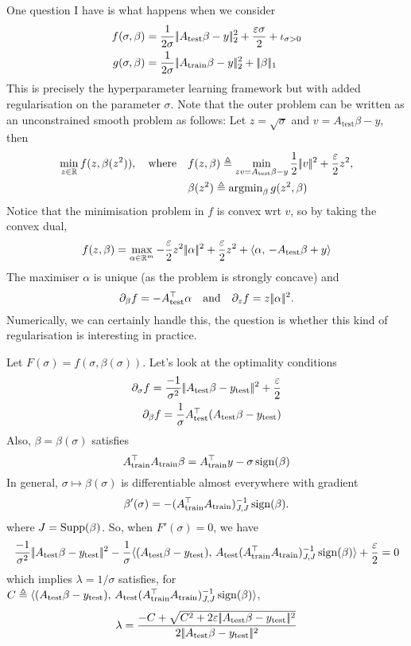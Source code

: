 \documentclass{article}
\begin{document}
One question I have is what happens when we consider
\begin{align*}
f(\sigma,\beta) &=  \frac{1}{2\sigma} |\!| A_{\mathrm{test}}\beta-y |\!|_2^2 +  \frac{\varepsilon\sigma}{2} +\iota_{\sigma>0}\\
g(\sigma,\beta) &= \frac{1}{2\sigma} |\!| A_{\mathrm{train}} \beta-y |\!|_2^2 +  |\!| \beta |\!|_1 
\end{align*}
This is precisely the hyperparameter learning framework but with added regularisation on the parameter $\sigma$. Note that the outer problem can be written as an unconstrained smooth problem as follows:
Let $z = \sqrt{\sigma}$ and $v =  A_{\mathrm{test}}\beta-y$, then
\begin{align*}
\min_{z\in\mathbb{R}}f(z, \beta(z^2)), \quad \text{where} \quad &f(z,\beta)\triangleq\min_{ zv =  A_{\mathrm{test}}\beta-y} \frac12  |\!| v |\!|^2 +\frac{\varepsilon}{2} z^2 ,\\
&
\beta(z^2) \triangleq \operatorname{argmin}_\beta g(z^2,\beta)
\end{align*}
Notice that the minimisation problem in $f$ is convex wrt $v$, so by taking the convex dual, 
\begin{align*}
f(z,\beta) = \max_{\alpha\in\mathbb{R}^m} - \frac{\varepsilon}{2}  z^2 |\!| \alpha |\!|^2 +\frac{\varepsilon}{2}  z^2 +\langle \alpha,\, -  A_{\mathrm{test}}\beta +y\rangle
\end{align*}
The maximiser $\alpha$ is unique (as the problem is strongly concave) and $$\partial_\beta f = -A_{\mathrm{test}}^\top \alpha \quad \text{and} \quad \partial_z f = z|\!| \alpha |\!|^2.$$
Numerically, we can certainly handle this, the question is whether this kind of regularisation is interesting in practice.

\newcommand{\Ate}{A_{\mathrm{test}}}
\newcommand{\yte}{y_{\mathrm{test}}}

\newcommand{\Atr}{A_{\mathrm{train}}}
\newcommand{\ytr}{y_{\mathrm{train}}}

Let $F(\sigma) = f(\sigma, \beta(\sigma))$.
Let's look at the optimality conditions\begin{align*}
\partial_\sigma f = \frac{-1}{\sigma^2} \norm{\Ate\beta -\yte}^2 + \frac{\epsilon}{2} \\
\partial_\beta f =  \frac{1}{\sigma} \Ate^\top (\Ate\beta -\yte) 
\end{align*}
Also, $\beta = \beta(\sigma)$ satisfies
$$
\Atr^\top \Atr \beta  = \Atr^\top  y -\sigma \sign(\beta)
$$
In general, $\sigma\mapsto \beta(\sigma)$ is differentiable almost everywhere with gradient
$$
 \beta'(\sigma)  = - (\Atr^\top \Atr)_{J,J}^{-1}  \sign(\beta).
$$
where $J=\operatorname{Supp}(\beta)$. So, when $F'(\sigma) = 0$, we have
$$
\frac{-1}{\sigma^2} \norm{\Ate\beta -\yte}^2 - \frac{1}{\sigma} \dotp{ (\Ate\beta -\yte) }{\Ate (\Atr^\top \Atr)_{J,J}^{-1}  \sign(\beta)}  + \frac{\epsilon}{2}   = 0
$$
which implies $\lambda = 1/\sigma$ satisfies, for $C\eqdef  \dotp{ (\Ate\beta -\yte) }{\Ate (\Atr^\top \Atr)_{J,J}^{-1}  \sign(\beta)}$,
$$
\lambda =  \frac{-C + \sqrt{C^2 + 2 \epsilon \norm{\Ate\beta -\yte}^2    }}{2\norm{\Ate\beta -\yte}^2 }
$$
\end{document}
